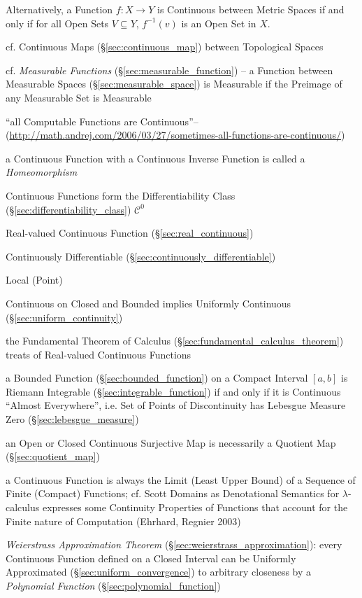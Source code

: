 Alternatively, a Function $f: X \rightarrow Y$ is Continuous between Metric
Spaces if and only if for all Open Sets $V \subseteq Y$, $f^{-1}(v)$ is an Open
Set in $X$.

\fist cf. Continuous Maps (\S\ref{sec:continuous_map}) between Topological
Spaces

\fist cf. \emph{Measurable Functions} (\S\ref{sec:measurable_function}) -- a
Function between Measurable Spaces (\S\ref{sec:measurable_space}) is Measurable
if the Preimage of any Measurable Set is Measurable

``all Computable Functions are Continuous''--
(\url{http://math.andrej.com/2006/03/27/sometimes-all-functions-are-continuous/})

a Continuous Function with a Continuous Inverse Function is called a
\emph{Homeomorphism}

Continuous Functions form the Differentiability Class
(\S\ref{sec:differentiability_class}) $\mathcal{C}^0$

Real-valued Continuous Function (\S\ref{sec:real_continuous})

Continuously Differentiable (\S\ref{sec:continuously_differentiable})

Local (Point)

Continuous on Closed and Bounded implies Uniformly Continuous
(\S\ref{sec:uniform_continuity})

the Fundamental Theorem of Calculus (\S\ref{sec:fundamental_calculus_theorem})
treats of Real-valued Continuous Functions

a Bounded Function (\S\ref{sec:bounded_function}) on a Compact Interval $[a,b]$
is Riemann Integrable (\S\ref{sec:integrable_function}) if and only if it is
Continuous ``Almost Everywhere'', i.e. Set of Points of Discontinuity has
Lebesgue Measure Zero (\S\ref{sec:lebesgue_measure})

an Open or Closed Continuous Surjective Map is necessarily a Quotient Map
(\S\ref{sec:quotient_map})

a Continuous Function is always the Limit (Least Upper Bound) of a Sequence of
Finite (Compact) Functions; cf. Scott Domains as Denotational Semantics for
$\lambda$-calculus expresses some Continuity Properties of Functions that
account for the Finite nature of Computation (Ehrhard, Regnier 2003)

\emph{Weierstrass Approximation Theorem}
(\S\ref{sec:weierstrass_approximation}): every Continuous Function defined on a
Closed Interval can be Uniformly Approximated (\S\ref{sec:uniform_convergence})
to arbitrary closeness by a \emph{Polynomial Function}
(\S\ref{sec:polynomial_function})

